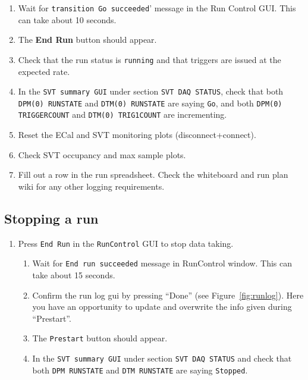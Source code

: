 \documentclass[12pt]{article}
\begin{document}
\begin{enumerate}
\begin{enumerate}

\item Wait for \texttt{transition Go succeeded}' message in the Run Control GUI. This can take about 10 seconds.
\item The \textbf{End Run} button should appear.

\item Check that the run status is \texttt{running} and that triggers are issued at the expected rate.

\item In the \texttt{SVT summary GUI} under section \texttt{SVT DAQ STATUS}, check that both \texttt{DPM(0) RUNSTATE}  and \texttt{DTM(0) RUNSTATE}  are saying \texttt{Go}, and both \texttt{DPM(0) TRIGGERCOUNT} and   \texttt{DTM(0) TRIG1COUNT}  are incrementing.


\item Reset the ECal and SVT monitoring plots (disconnect+connect). 

\item Check SVT occupancy and max sample plots.

\item Fill out a row in the run spreadsheet. Check the whiteboard and run plan wiki for any other logging requirements.

\end{enumerate}
\end{enumerate}

\subsection{Stopping a run}

\begin{enumerate}

\item
\label{item:stop}
Press \texttt{End Run} in the \texttt{RunControl}  GUI to stop data taking.

\begin{enumerate}
\item Wait for \texttt{End run succeeded} message in RunControl window. This can take about 15 seconds.
\item Confirm the run log gui by pressing ``Done'' (see Figure~\ref{fig:runlog}).  Here you have an opportunity to update and overwrite the info given during ``Prestart''.  
\item The \texttt{Prestart} button should appear.
\item In the \texttt{SVT summary GUI} under section \texttt{SVT DAQ STATUS} and check that both \texttt{DPM RUNSTATE}  and \texttt{DTM RUNSTATE}  are saying \texttt{Stopped}.
\end{enumerate}
\end{enumerate}
\end{document}
